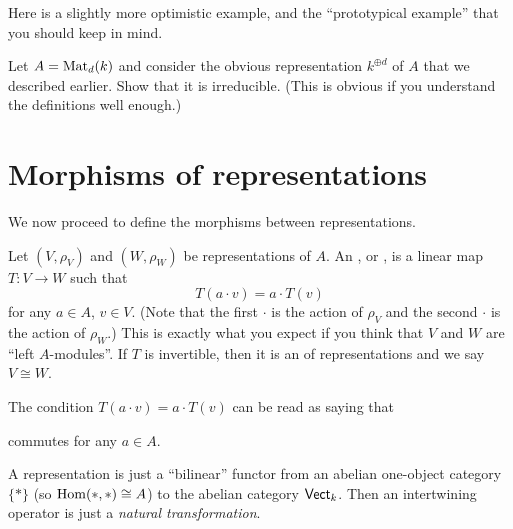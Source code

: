 Here is a slightly more optimistic example,
and the ``prototypical example'' that you should keep in mind.

\begin{exercise}
	Let $A = \mathrm{Mat}_d(k)$ and consider the obvious representation $k^{\oplus d}$
	of $A$ that we described earlier. Show that it is irreducible.
	(This is obvious if you understand the definitions well enough.)
\end{exercise}

\section{Morphisms of representations}
We now proceed to define the morphisms between representations.

\begin{definition}
	Let $(V, \rho_V)$ and $(W, \rho_W)$ be representations of $A$.
	An , or , is a
	linear map $T \colon V \to W$ such that
	\[ T(a \cdot v) = a \cdot T(v) \]
	for any $a \in A$, $v \in V$.
	(Note that the first $\cdot$ is the action of $\rho_V$
	and the second $\cdot$ is the action of $\rho_W$.)
	This is exactly what you expect if you think that $V$ and $W$
	are ``left $A$-modules''.
	If $T$ is invertible, then it is an  of representations
	and we say $V \cong W$.
\end{definition}
\begin{remark}
	The condition $T(a \cdot v) = a \cdot T(v)$ can be read as saying that
	\begin{center}
	\end{center}
	commutes for any $a \in A$.
\end{remark}

\begin{remark}
	A representation is just a ``bilinear'' functor from an
	abelian one-object category $\{\ast\}$ (so $\operatorname{Hom}(\ast, \ast) \cong A$)
	to the abelian category $\mathsf{Vect}_k$.
	Then an intertwining operator is just a \emph{natural transformation}.
\end{remark}

